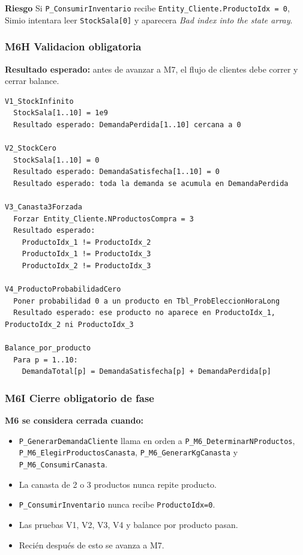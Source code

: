 \documentclass[11pt]{article}
\newcommand{\state}[1]{\texttt{#1}}
\newcommand{\proc}[1]{\texttt{#1}}
\newcommand{\risk}{\textcolor{rojoriesgo}{\textbf{Riesgo}}}
\begin{document}
\risk{} Si \proc{P\_ConsumirInventario} recibe \state{Entity\_Cliente.ProductoIdx = 0}, Simio intentara leer \state{StockSala[0]} y aparecera \textit{Bad index into the state array}.

\subsubsection{M6H Validacion obligatoria}
\textbf{Resultado esperado:} antes de avanzar a M7, el flujo de clientes debe correr y cerrar balance.

\begin{lstlisting}[caption={Pruebas obligatorias de cierre M6}]
V1_StockInfinito
  StockSala[1..10] = 1e9
  Resultado esperado: DemandaPerdida[1..10] cercana a 0

V2_StockCero
  StockSala[1..10] = 0
  Resultado esperado: DemandaSatisfecha[1..10] = 0
  Resultado esperado: toda la demanda se acumula en DemandaPerdida

V3_Canasta3Forzada
  Forzar Entity_Cliente.NProductosCompra = 3
  Resultado esperado:
    ProductoIdx_1 != ProductoIdx_2
    ProductoIdx_1 != ProductoIdx_3
    ProductoIdx_2 != ProductoIdx_3

V4_ProductoProbabilidadCero
  Poner probabilidad 0 a un producto en Tbl_ProbEleccionHoraLong
  Resultado esperado: ese producto no aparece en ProductoIdx_1, ProductoIdx_2 ni ProductoIdx_3

Balance_por_producto
  Para p = 1..10:
    DemandaTotal[p] = DemandaSatisfecha[p] + DemandaPerdida[p]
\end{lstlisting}

\subsubsection{M6I Cierre obligatorio de fase}
\textbf{M6 se considera cerrada cuando:}
\begin{itemize}
  \item \proc{P\_GenerarDemandaCliente} llama en orden a \proc{P\_M6\_DeterminarNProductos}, \proc{P\_M6\_ElegirProductosCanasta}, \proc{P\_M6\_GenerarKgCanasta} y \proc{P\_M6\_ConsumirCanasta}.
  \item La canasta de 2 o 3 productos nunca repite producto.
  \item \proc{P\_ConsumirInventario} nunca recibe \state{ProductoIdx=0}.
  \item Las pruebas V1, V2, V3, V4 y balance por producto pasan.
  \item Recién después de esto se avanza a M7.
\end{itemize}
\end{document}
